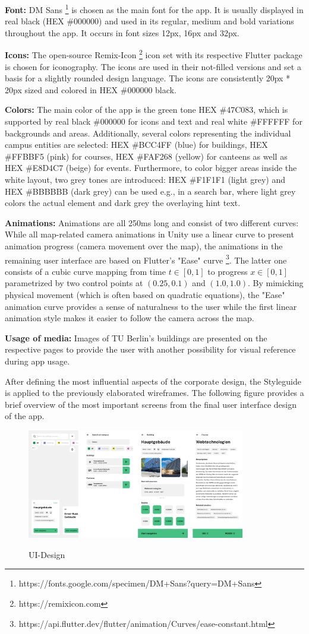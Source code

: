 \textbf{Font:} DM Sans \footnote{https://fonts.google.com/specimen/DM+Sans?query=DM+Sans} is chosen as the main font for the app. It is usually displayed in real black (HEX \#000000) and used in its regular, medium and bold variations throughout the app. It occurs in font sizes 12px, 16px and 32px.

\textbf{Icons:} The open-source Remix-Icon \footnote{https://remixicon.com} icon set with its respective Flutter package is chosen for iconography. The icons are used in their not-filled versions and set a basis for a slightly rounded design language. The icons are consistently 20px * 20px sized and colored in HEX \#000000 black.

\textbf{Colors:} The main color of the app is the green tone HEX \#47C083, which is supported by real black \#000000 for icons and text and real white \#FFFFFF for backgrounds and areas. Additionally, several colors representing the individual campus entities are selected: HEX \#BCC4FF (blue) for buildings, HEX \#FFBBF5 (pink) for courses, HEX \#FAF268 (yellow) for canteens as well as HEX \#E8D4C7 (beige) for events. Furthermore, to color bigger areas inside the white layout, two grey tones are introduced: HEX \#F1F1F1 (light grey) and HEX \#BBBBBB (dark grey) can be used e.g., in a search bar, where light grey colors the actual element and dark grey the overlaying hint text.

\textbf{Animations:} Animations are all 250ms long and consist of two different curves: While all map-related camera animations in Unity use a linear curve to present animation progress (camera movement over the map), the animations in the remaining user interface are based on Flutter's "Ease" curve \footnote{https://api.flutter.dev/flutter/animation/Curves/ease-constant.html}. The latter one consists of a cubic curve mapping from time $t \in [0, 1]$ to progress $x \in [0, 1]$ parametrized by two control points at $(0.25, 0.1)$ and $(1.0, 1.0)$. By mimicking physical movement (which is often based on quadratic equations), the "Ease" animation curve provides a sense of naturalness to the user while the first linear animation style makes it easier to follow the camera across the map.

\textbf{Usage of media:} Images of TU Berlin's buildings are presented on the respective pages to provide the user with another possibility for visual reference during app usage.

After defining the most influential aspects of the corporate design, the Styleguide is applied to the previously elaborated wireframes. The following figure provides a brief overview of the most important screens from the final user interface design of the app.

\begin{figure}[H]
	\centering
	\includegraphics[width=0.85\textwidth]{images/ui_design.png}\\
	\caption{UI-Design}
\end{figure}